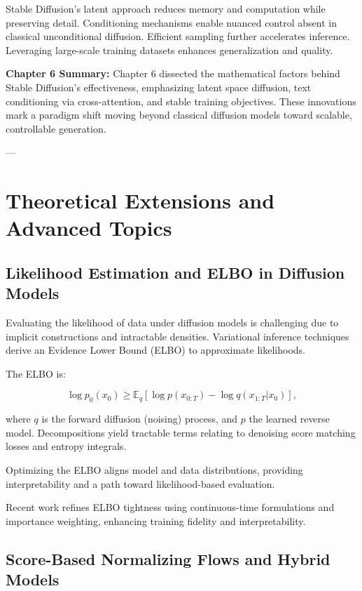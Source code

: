 \documentclass[a4paper,12pt,oneside]{memoir}
\begin{document}
Stable Diffusion’s latent approach reduces memory and computation while preserving detail. Conditioning mechanisms enable nuanced control absent in classical unconditional diffusion. Efficient sampling further accelerates inference. Leveraging large-scale training datasets enhances generalization and quality.

\textbf{Chapter 6 Summary:}  
Chapter 6 dissected the mathematical factors behind Stable Diffusion’s effectiveness, emphasizing latent space diffusion, text conditioning via cross-attention, and stable training objectives. These innovations mark a paradigm shift moving beyond classical diffusion models toward scalable, controllable generation.

---

\chapter{Theoretical Extensions and Advanced Topics}

\section{Likelihood Estimation and ELBO in Diffusion Models}

Evaluating the likelihood of data under diffusion models is challenging due to implicit constructions and intractable densities. Variational inference techniques derive an Evidence Lower Bound (ELBO) to approximate likelihoods.

The ELBO is:

\[
\log p_0(x_0) \geq \mathbb{E}_{q} \left[ \log p(x_{0:T}) - \log q(x_{1:T}|x_0) \right],
\]

where \( q \) is the forward diffusion (noising) process, and \( p \) the learned reverse model. Decompositions yield tractable terms relating to denoising score matching losses and entropy integrals.

Optimizing the ELBO aligns model and data distributions, providing interpretability and a path toward likelihood-based evaluation.

Recent work refines ELBO tightness using continuous-time formulations and importance weighting, enhancing training fidelity and interpretability.

\section{Score-Based Normalizing Flows and Hybrid Models}
\end{document}
